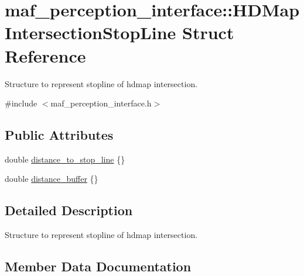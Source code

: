 \hypertarget{structmaf__perception__interface_1_1HDMapIntersectionStopLine}{}\section{maf\+\_\+perception\+\_\+interface\+:\+:H\+D\+Map\+Intersection\+Stop\+Line Struct Reference}
\label{structmaf__perception__interface_1_1HDMapIntersectionStopLine}


Structure to represent stopline of hdmap intersection.  




{\ttfamily \#include $<$maf\+\_\+perception\+\_\+interface.\+h$>$}

\subsection*{Public Attributes}
\begin{DoxyCompactItemize}
\item 
double \hyperlink{structmaf__perception__interface_1_1HDMapIntersectionStopLine_abfac54573810f88652326333f285f1c1}{distance\+\_\+to\+\_\+stop\+\_\+line} \{\}
\item 
double \hyperlink{structmaf__perception__interface_1_1HDMapIntersectionStopLine_a5d995c8101198ebda06091143c3522e3}{distance\+\_\+buffer} \{\}
\end{DoxyCompactItemize}


\subsection{Detailed Description}
Structure to represent stopline of hdmap intersection. 

\subsection{Member Data Documentation}
\mbox{\label{structmaf__perception__interface_1_1HDMapIntersectionStopLine_a5d995c8101198ebda06091143c3522e3}} 
